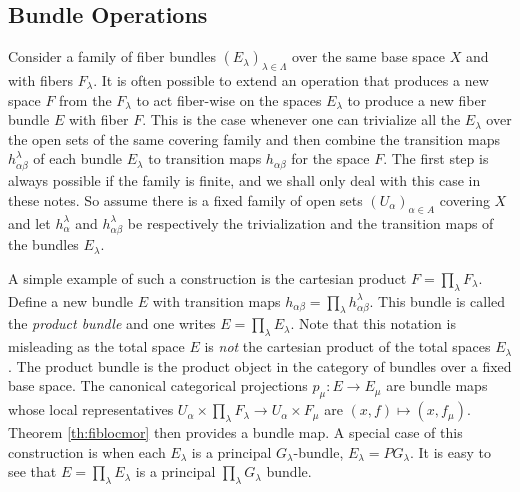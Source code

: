 \documentclass[12pt,titlepage]{article}
\begin{document}
\subsection{Bundle Operations}\label{sec:bundleops}
Consider a family of  fiber bundles \((E_\lambda)_{\lambda\in\Lambda}\)
over the same base space \(X\) and
with fibers \(F_\lambda\). It is often possible to extend an operation
that produces a new
space \(F\) from the \(F_\lambda\) to act fiber-wise on the spaces
 \(E_\lambda\)  to produce a new fiber bundle \(E\) with fiber
\(F\). This is the case whenever one can trivialize all the
\(E_\lambda\)  over the open sets of the same covering family and then
 combine the transition maps \(h^\lambda_{\alpha\beta}\)
of each bundle \(E_\lambda\) to  transition maps \(h_{\alpha\beta}\) for
the space \(F\). The first step is always possible if the family is
finite, and we shall only deal with this case in these notes. So assume
there is a fixed family of open sets \((U_\alpha)_{\alpha\in A}\)
covering \(X\) and let \(h^\lambda_\alpha\) and
\(h^\lambda_{\alpha\beta}\) be respectively the  trivialization
and the transition maps of the bundles \(E_\lambda\).

A simple example of such a construction is the cartesian product
\(F={\prod}_\lambda F_\lambda\). Define a new bundle \(E\)
with transition maps
\(h_{\alpha\beta}={\prod}_\lambda
h^\lambda_{\alpha\beta}\). This bundle is called the {\em product
bundle\/}
%
 and one writes \(E={\prod}_\lambda E_\lambda\). Note that this 
notation is misleading as the total space \(E\) is {\em not\/} 
the cartesian 
product of the total spaces \(E_\lambda\). The product bundle 
is the product 
object in the category of bundles over a fixed base space. The canonical 
categorical projections \linebreak \(p_\mu : E \to E_\mu\) are 
bundle maps whose local 
representatives \(U_\alpha \times \prod_\lambda F_\lambda \to 
U_\alpha\times 
F_\mu\) are \((x,f)\mapsto (x,f_\mu)\). Theorem \ref{th:fiblocmor} then
provides a bundle map.
A special case of this construction 
is when each \(E_\lambda\) is a principal \(G_\lambda\)-bundle, 
\(E_\lambda=PG_\lambda\). It is easy to see that \(E={\prod}_\lambda 
E_\lambda\) is a principal \(\prod_\lambda G_\lambda\) bundle. 
\end{document}
